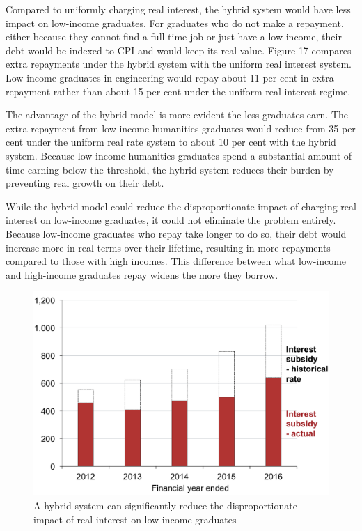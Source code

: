 \documentclass[embargoed]{grattan}
\begin{document}
Compared to uniformly charging real interest, the hybrid system would have less impact on low-income graduates.
For graduates who do not make a repayment, either because they cannot find a full-time job or just have a low income, their debt would be indexed to \gls{CPI} and would keep its real value.
Figure 17 compares extra repayments under the hybrid system with the uniform real interest system.
Low-income graduates in engineering would repay about 11 per cent in extra repayment rather than about 15 per cent under the uniform real interest regime.

The advantage of the hybrid model is more evident the less graduates earn.
The extra repayment from low-income humanities graduates would reduce from 35 per cent under the uniform real rate system to about 10 per cent with the hybrid system.
Because low-income humanities graduates spend a substantial amount of time earning below the threshold, the hybrid system reduces their burden by preventing real growth on their debt.

While the hybrid model could reduce the disproportionate impact of charging real interest on low-income graduates, it could not eliminate the problem entirely.
Because low-income graduates who repay take longer to do so, their debt would increase more in real terms over their lifetime, resulting in more repayments compared to those with high incomes.
This difference between what low-income and high-income graduates repay widens the more they borrow.

\begin{figure}
\caption{A hybrid system can significantly reduce the disproportionate impact of real interest on low-income graduates}\label{fig:fig17-a-hybrid-system-can-signif-reduce-disprop-impact-of-real-interest-low-income-grads}


\includegraphics[page=17]{atlas/Chartpack.pdf}
\end{figure}
\end{document}
